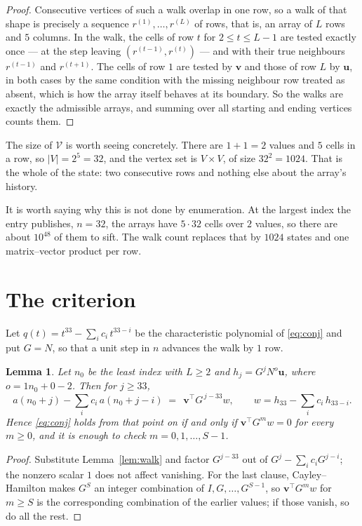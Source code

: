 \documentclass[11pt,a4paper]{article}
\theoremstyle{plain}
\newtheorem{lemma}[theorem]{Lemma}
\theoremstyle{definition}
\begin{document}
\begin{proof}
Consecutive vertices of such a walk overlap in one row, so a walk of that shape is
precisely a sequence $r^{(1)},\dots,r^{(L)}$ of rows, that is, an array of $L$ rows
and $5$ columns. In the walk, the cells of row $t$ for $2\le t\le L-1$ are tested
exactly once --- at the step leaving $(r^{(t-1)},r^{(t)})$ --- and with their true
neighbours $r^{(t-1)}$ and $r^{(t+1)}$. The cells of row $1$ are tested by
$\mathbf{v}$ and those of row $L$ by $\mathbf{u}$, in both cases by the same condition
with the missing neighbour row treated as absent, which is how the array itself behaves at
its boundary. So the walks are exactly the admissible arrays, and summing over all starting
and ending vertices counts them.
\end{proof}


The size of $\mathcal V$ is worth seeing concretely. There are $1+1=2$ values
and $5$ cells in a row, so $|V|=2^{5}=32$, and the vertex set is
$V\times V$, of size $32^2=1024$. That is the whole of the state: two consecutive
rows and nothing else about the array's history.

It is worth saying why this is not done by enumeration. At the largest index the entry
publishes, $n=32$, the arrays have $5\cdot32$ cells over
$2$ values, so there are about $10^{48}$ of them to sift. The
walk count replaces that by $1024$ states and one matrix--vector product per row.
\section{The criterion}

Let $q(t)=t^{33}-\sum_i c_i\,t^{33-i}$ be the characteristic polynomial of
\eqref{eq:conj} and put $G=N$, so that a unit step in $n$ advances the walk by
$1$ row.

\begin{lemma}\label{lem:crit}
Let $n_0$ be the least index with $L\ge2$ and $h_j=G^{j}N^{o}\mathbf{u}$, where
$o=1n_0+0-2$. Then for $j\ge33$,
\[
a(n_0+j)-\sum_i c_i\,a(n_0+j-i)\;=\;\,\mathbf{v}^{\!\top}G^{\,j-33}w,
\qquad w=h_{33}-\sum_i c_i\,h_{33-i} .
\]
Hence \eqref{eq:conj} holds from that point on if and only if
$\mathbf{v}^{\!\top}G^{m}w=0$ for every $m\ge0$, and it is enough to check
$m=0,1,\dots,S-1$.
\end{lemma}

\begin{proof}
Substitute Lemma~\ref{lem:walk} and factor $G^{j-33}$ out of
$G^{j}-\sum_ic_iG^{j-i}$; the nonzero scalar $1$ does not affect
vanishing. For the last clause, Cayley--Hamilton makes $G^{S}$ an integer combination of
$I,G,\dots,G^{S-1}$, so $\mathbf{v}^{\!\top}G^{m}w$ for $m\ge S$ is the corresponding
combination of the earlier values; if those vanish, so do all the rest.
\end{proof}
\end{document}
